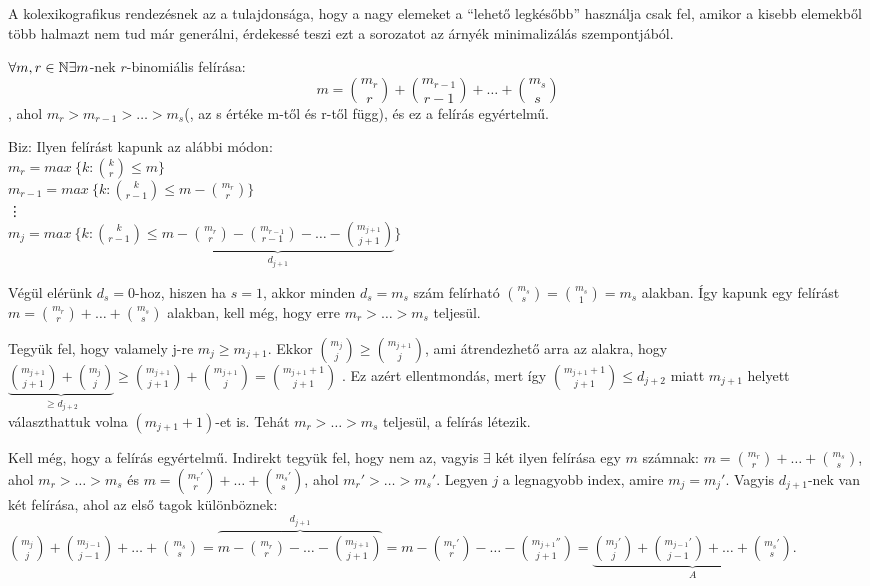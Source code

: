 \medskip

A kolexikografikus rendezésnek az a tulajdonsága, hogy a nagy elemeket a ``lehető legkésőbb'' használja csak fel, amikor a kisebb elemekből több halmazt nem tud már generálni, érdekessé teszi ezt a sorozatot az árnyék minimalizálás szempontjából.

\begin{thm}
  $\forall m, r \in \mathbb{N} \exists m$-nek $r$-binomiális felírása:
  \[m = \binom{m_r}{r} + \binom{m_{r-1}}{r-1} + \dots + \binom{m_s}{s}\], ahol $m_r > m_{r-1} > \dots > m_s$(, az s értéke m-től és r-től függ), és ez a felírás egyértelmű.
\end{thm}

\begin{samepage} %
  Biz: Ilyen felírást kapunk az alábbi módon: \\
  $m_r = max~\{k: \binom{k}{r} \leq m\}$ \\
  $m_{r-1} = max~\{k: \binom{k}{r-1} \leq m - \binom{m_r}{r}\}$ \\
  \vdots \\
  $m_j = max~\{k: \binom{k}{r-1} \leq \underbrace{m - \binom{m_r}{r} - \binom{m_{r-1}}{r-1} - \dots - \binom{m_{j+1}}{j+1}}_{d_{j+1}}\}$
\end{samepage}

Végül elérünk $d_s = 0$-hoz, hiszen ha $s=1$, akkor minden $d_s = m_s$ szám felírható $\binom{m_s}{s} = \binom{m_s}{1} = m_s$ alakban. Így kapunk egy felírást $m = \binom{m_r}{r} + \dots + \binom{m_s}{s}$ alakban, kell még, hogy erre $m_r > \dots > m_s$ teljesül.

\bigskip

Tegyük fel, hogy valamely j-re $m_j \geq m_{j+1}$. Ekkor $\binom{m_j}{j} \geq \binom{m_{j+1}}{j}$, ami átrendezhető arra az alakra, hogy $\underbrace{\binom{m_{j+1}}{j+1} + \binom{m_j}{j}}_{\geq d_{j+2}} \geq \binom{m_{j+1}}{j+1} + \binom{m_{j+1}}{j} = \binom{m_{j+1} + 1}{j+1}$ \Lightning. Ez azért ellentmondás, mert így $\binom{m_{j+1}+1}{j+1} \leq d_{j+2}$ miatt $m_{j+1}$ helyett választhattuk volna $(m_{j+1} + 1)$-et is. Tehát $m_r > \dots > m_s$ teljesül, a felírás létezik.

\bigskip

Kell még, hogy a felírás egyértelmű. Indirekt tegyük fel, hogy nem az, vagyis $\exists$ két ilyen felírása egy $m$ számnak: $m = \binom{m_r}{r} + \dots + \binom{m_s}{s}$, ahol $m_r > \dots > m_s$ és $m = \binom{m_r'}{r} + \dots + \binom{m_s'}{s}$, ahol $m_r' > \dots > m_s'$. Legyen $j$ a legnagyobb index, amire $m_j = m_j'$. Vagyis $d_{j+1}$-nek van két felírása, ahol az első tagok különböznek: $\binom{m_j}{j} + \binom{m_{j-1}}{j-1} + \dots + \binom{m_s}{s} = \overbrace{m - \binom{m_r}{r} - \dots - \binom{m_{j+1}}{j+1}}^{d_{j+1}} = m - \binom{m_r'}{r} - \dots - \binom{m_{j+1}''}{j+1} = \underbrace{\binom{m_j'}{j} + \binom{m_{j-1}'}{j-1} + \dots + \binom{m_s'}{s}}_{A}$.

